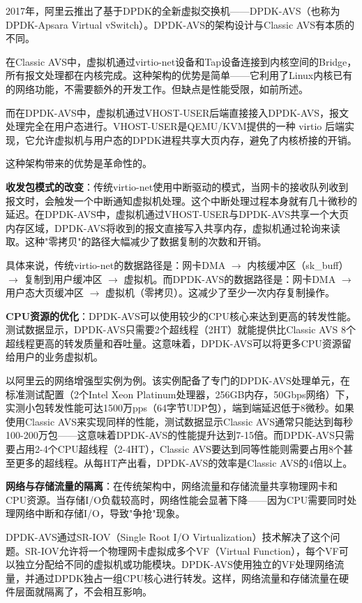 2017年，阿里云推出了基于DPDK的全新虚拟交换机——DPDK-AVS（也称为DPDK-Apsara Virtual vSwitch）。DPDK-AVS的架构设计与Classic AVS有本质的不同。

在Classic AVS中，虚拟机通过virtio-net设备和Tap设备连接到内核空间的Bridge，所有报文处理都在内核完成。这种架构的优势是简单——它利用了Linux内核已有的网络功能，不需要额外的开发工作。但缺点是性能受限，如前所述。

而在DPDK-AVS中，虚拟机通过VHOST-USER后端直接接入DPDK-AVS，报文处理完全在用户态进行。VHOST-USER是QEMU/KVM提供的一种 virtio 后端实现，它允许虚拟机与用户态的DPDK进程共享大页内存，避免了内核桥接的开销。

这种架构带来的优势是革命性的。

\textbf{收发包模式的改变}：传统virtio-net使用中断驱动的模式，当网卡的接收队列收到报文时，会触发一个中断通知虚拟机处理。这个中断处理过程本身就有几十微秒的延迟。在DPDK-AVS中，虚拟机通过VHOST-USER与DPDK-AVS共享一个大页内存区域，DPDK-AVS将收到的报文直接写入共享内存，虚拟机通过轮询来读取。这种"零拷贝"的路径大幅减少了数据复制的次数和开销。

具体来说，传统virtio-net的数据路径是：网卡DMA $\rightarrow$ 内核缓冲区（sk_buff） $\rightarrow$ 复制到用户缓冲区 $\rightarrow$ 虚拟机。而DPDK-AVS的数据路径是：网卡DMA $\rightarrow$ 用户态大页缓冲区 $\rightarrow$ 虚拟机（零拷贝）。这减少了至少一次内存复制操作。

\textbf{CPU资源的优化}：DPDK-AVS可以使用较少的CPU核心来达到更高的转发性能。测试数据显示，DPDK-AVS只需要2个超线程（2HT）就能提供比Classic AVS 8个超线程更高的转发质量和吞吐量。这意味着，DPDK-AVS可以将更多CPU资源留给用户的业务虚拟机。

以阿里云的网络增强型实例为例。该实例配备了专门的DPDK-AVS处理单元，在标准测试配置（2个Intel Xeon Platinum处理器，256GB内存，50Gbps网络）下，实测小包转发性能可达1500万pps（64字节UDP包），端到端延迟低于8微秒。如果使用Classic AVS来实现同样的性能，测试数据显示Classic AVS通常只能达到每秒100-200万包——这意味着DPDK-AVS的性能提升达到7-15倍。而DPDK-AVS只需要占用2-4个CPU超线程（2-4HT），Classic AVS要达到同等性能则需要占用8个甚至更多的超线程。从每HT产出看，DPDK-AVS的效率是Classic AVS的4倍以上。

\textbf{网络与存储流量的隔离}：在传统架构中，网络流量和存储流量共享物理网卡和CPU资源。当存储I/O负载较高时，网络性能会显著下降——因为CPU需要同时处理网络中断和存储I/O，导致"争抢"现象。

DPDK-AVS通过SR-IOV（Single Root I/O Virtualization）技术解决了这个问题。SR-IOV允许将一个物理网卡虚拟成多个VF（Virtual Function），每个VF可以独立分配给不同的虚拟机或功能模块。DPDK-AVS使用独立的VF处理网络流量，并通过DPDK独占一组CPU核心进行转发。这样，网络流量和存储流量在硬件层面就隔离了，不会相互影响。

